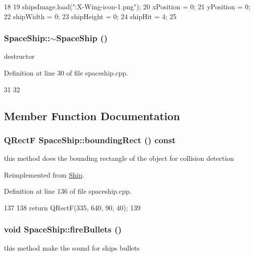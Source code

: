 \begin{DoxyCode}
18 {
19     shipsImage.load(":X-Wing-icon-1.png");
20     xPosition = 0;
21     yPosition = 0;
22     shipWidth = 0;
23     shipHeight = 0;
24     shipHit = 4;
25 }
\end{DoxyCode}
\hypertarget{class_space_ship_a4442daaa9cdc06a0ff885aedabf8abf0}{
\subsubsection[{$\sim$SpaceShip}]{\setlength{\rightskip}{0pt plus 5cm}SpaceShip::$\sim$SpaceShip ()}}
\label{class_space_ship_a4442daaa9cdc06a0ff885aedabf8abf0}
destructor 

Definition at line 30 of file spaceship.cpp.


\begin{DoxyCode}
31 {
32 }
\end{DoxyCode}


\subsection{Member Function Documentation}
\hypertarget{class_space_ship_a209b405c57298a7fd22edcf609d9ab36}{
\subsubsection[{boundingRect}]{\setlength{\rightskip}{0pt plus 5cm}QRectF SpaceShip::boundingRect () const}}
\label{class_space_ship_a209b405c57298a7fd22edcf609d9ab36}
this method does the bounding rectangle of the object for collision detection 

Reimplemented from \hyperlink{class_ship_a40856df827844b4045eb97345f401995}{Ship}.

Definition at line 136 of file spaceship.cpp.


\begin{DoxyCode}
137 {
138     return QRectF(335, 640, 90, 40);
139 }
\end{DoxyCode}
\hypertarget{class_space_ship_ac941a05362258554baff929244c9e9f7}{
\subsubsection[{fireBullets}]{\setlength{\rightskip}{0pt plus 5cm}void SpaceShip::fireBullets ()}}
\label{class_space_ship_ac941a05362258554baff929244c9e9f7}
this method make the sound for ships bullets 

